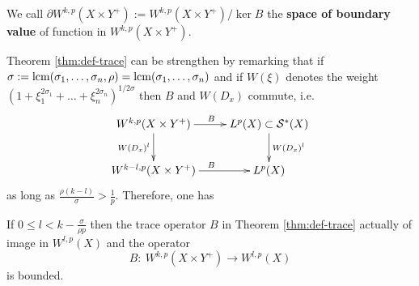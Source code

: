 \begin{definition}
We call \(\partial W^{k,p}(X\times Y^+):= W^{k,p}(X\times Y^+)/\ker B\) the \textbf{space of
boundary value} of function in \(W^{k,p}(X\times Y^+)\).
\end{definition}

Theorem \ref{thm:def-trace} can be strengthen by remarking that if \(\sigma:=
\mathop{\rm lcm}\nolimits(\sigma_1,\dots,\sigma_n,\rho) = \mathop{\rm lcm}\nolimits (\sigma_1,\dots,\sigma_n)\) and if \(W(\xi)\)
denotes the weight \((1+\xi_1^{2\sigma_1}+\dots+\xi_n^{2\sigma_n})^{1/2\sigma}\) then \(B\) and \(W(D_x)\) commute, i.e.
\[
 \xymatrix{
W^{k,p}(X\times Y^+) \ar@{->}[d]_{W(D_x)^l} \ar@{->}[r]^{B} & L^p(X)\subset \mathcal{S}^*(X) \ar@{->}[d]^{W(D_x)^l} \\
W^{k-l,p}(X\times Y^+) \ar@{->}[r]^{B} & L^p(X)
}
\]
as long as \(\frac{\rho(k-l)}{\sigma} > \frac{1}{p}\). Therefore, one has

\begin{theorem}
\label{thm:trace-reg}
If \(0\leq l < k- \frac{\sigma}{\rho p}\) then the trace operator \(B\) in Theorem
\ref{thm:def-trace} actually of image in \(W^{l,p}(X)\) and the operator \[ B:\
W^{k,p}(X\times Y^+) \longrightarrow W^{l,p}(X) \] is bounded.
\end{theorem}

